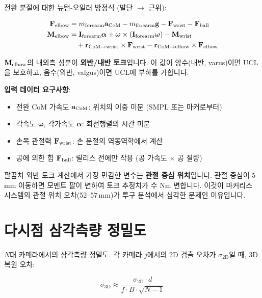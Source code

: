 \documentclass[11pt, a4paper]{report}
\begin{document}
전완 분절에 대한 뉴턴-오일러 방정식 (발단 $\rightarrow$ 근위):

\begin{align}
\mathbf{F}_{\text{elbow}} &= m_{\text{forearm}} \mathbf{a}_{\text{CoM}} - m_{\text{forearm}} \mathbf{g} - \mathbf{F}_{\text{wrist}} - \mathbf{F}_{\text{ball}} \\
\mathbf{M}_{\text{elbow}} &= \mathbf{I}_{\text{forearm}} \bm{\alpha} + \bm{\omega} \times (\mathbf{I}_{\text{forearm}} \bm{\omega}) - \mathbf{M}_{\text{wrist}} \notag \\
&\quad + \mathbf{r}_{\text{CoM} \rightarrow \text{wrist}} \times \mathbf{F}_{\text{wrist}} - \mathbf{r}_{\text{CoM} \rightarrow \text{elbow}} \times \mathbf{F}_{\text{elbow}}
\end{align}

$\mathbf{M}_{\text{elbow}}$의 내외측 성분이 \textbf{외반/내반 토크}입니다. 이 값이 양수(내반, varus)이면 UCL을 보호하고, 음수(외반, valgus)이면 UCL에 부하를 가합니다.

\textbf{입력 데이터 요구사항}:
\begin{itemize}[leftmargin=*]
  \item 전완 CoM 가속도 $\mathbf{a}_{\text{CoM}}$: 위치의 이중 미분 (SMPL 또는 마커로부터)
  \item 각속도 $\bm{\omega}$, 각가속도 $\bm{\alpha}$: 회전행렬의 시간 미분
  \item 손목 관절력 $\mathbf{F}_{\text{wrist}}$: 손 분절의 역동역학에서 계산
  \item 공에 의한 힘 $\mathbf{F}_{\text{ball}}$: 릴리스 전에만 작용 (공 가속도 $\times$ 공 질량)
\end{itemize}

\begin{importantnote}
팔꿈치 외반 토크 계산에서 가장 민감한 변수는 \textbf{관절 중심 위치}입니다. 관절 중심이 5\,mm 이동하면 모멘트 팔이 변하여 토크 추정치가 수 Nm 변합니다. 이것이 마커리스 시스템의 관절 위치 오차(52--57\,mm)가 투구 분석에서 심각한 문제인 이유입니다.
\end{importantnote}


\section{다시점 삼각측량 정밀도}
\label{sec:triangulation_precision}

$N$대 카메라에서의 삼각측량 정밀도. 각 카메라 $j$에서의 2D 검출 오차가 $\sigma_{\text{2D}}$일 때, 3D 복원 오차:

\begin{equation}
\sigma_{\text{3D}} \approx \frac{\sigma_{\text{2D}} \cdot d}{f \cdot B \cdot \sqrt{N-1}}
\end{equation}
\end{document}
